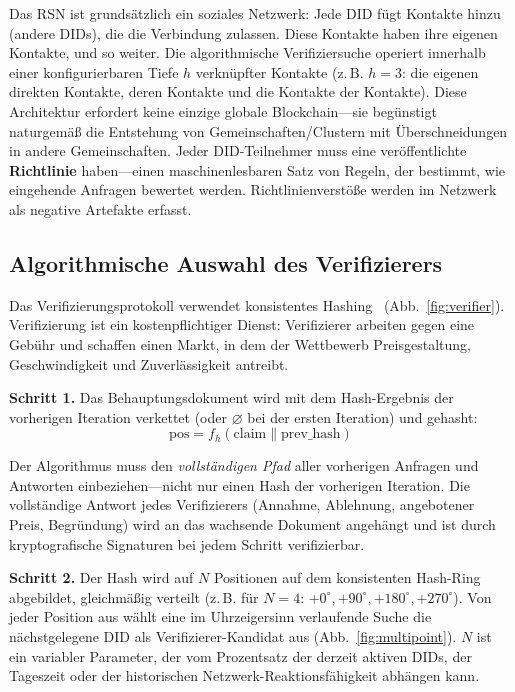 \documentclass[11pt,a4paper,twocolumn]{article}
\begin{document}
Das RSN ist grundsätzlich ein soziales Netzwerk: Jede DID fügt Kontakte hinzu (andere DIDs), die die Verbindung zulassen. Diese Kontakte haben ihre eigenen Kontakte, und so weiter. Die algorithmische Verifiziersuche operiert innerhalb einer konfigurierbaren Tiefe $h$ verknüpfter Kontakte (z.\,B. $h=3$: die eigenen direkten Kontakte, deren Kontakte und die Kontakte der Kontakte). Diese Architektur erfordert keine einzige globale Blockchain---sie begünstigt naturgemäß die Entstehung von Gemeinschaften/Clustern mit Überschneidungen in andere Gemeinschaften. Jeder DID-Teilnehmer muss eine veröffentlichte \textbf{Richtlinie} haben---einen maschinenlesbaren Satz von Regeln, der bestimmt, wie eingehende Anfragen bewertet werden. Richtlinienverstöße werden im Netzwerk als negative Artefakte erfasst.

\subsection{Algorithmische Auswahl des Verifizierers}

Das Verifizierungsprotokoll verwendet konsistentes Hashing~\cite{karger1997} (Abb.~\ref{fig:verifier}). Verifizierung ist ein kostenpflichtiger Dienst: Verifizierer arbeiten gegen eine Gebühr und schaffen einen Markt, in dem der Wettbewerb Preisgestaltung, Geschwindigkeit und Zuverlässigkeit antreibt.

\textbf{Schritt 1.} Das Behauptungsdokument wird mit dem Hash-Ergebnis der vorherigen Iteration verkettet (oder $\varnothing$ bei der ersten Iteration) und gehasht:
\begin{equation}
\text{pos} = f_h(\text{claim} \| \text{prev\_hash})
\label{eq:hash}
\end{equation}

Der Algorithmus muss den \emph{vollständigen Pfad} aller vorherigen Anfragen und Antworten einbeziehen---nicht nur einen Hash der vorherigen Iteration. Die vollständige Antwort jedes Verifizierers (Annahme, Ablehnung, angebotener Preis, Begründung) wird an das wachsende Dokument angehängt und ist durch kryptografische Signaturen bei jedem Schritt verifizierbar.

\textbf{Schritt 2.} Der Hash wird auf $N$ Positionen auf dem konsistenten Hash-Ring abgebildet, gleichmäßig verteilt (z.\,B. für $N=4$: $+0^{\circ}, +90^{\circ}, +180^{\circ}, +270^{\circ}$). Von jeder Position aus wählt eine im Uhrzeigersinn verlaufende Suche die nächstgelegene DID als Verifizierer-Kandidat aus (Abb.~\ref{fig:multipoint}). $N$ ist ein variabler Parameter, der vom Prozentsatz der derzeit aktiven DIDs, der Tageszeit oder der historischen Netzwerk-Reaktionsfähigkeit abhängen kann.
\end{document}
